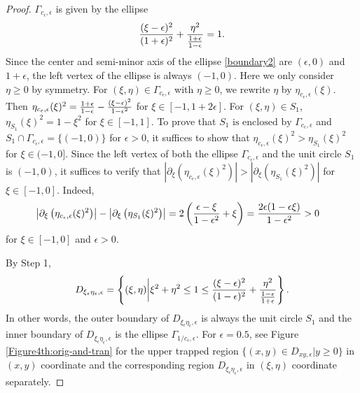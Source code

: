 \documentclass[1 [leqno, 11pt]{amsart}
\numberwithin{equation}{section}
\let\ep=\epsilon
\begin{document}
\begin{CJK*}{GBK}{song}
\begin{proof}
$\Gamma_{c_\ep,\ep}$ is given by the ellipse
\begin{align}\label{boundary2}
\frac{(\xi - \ep)^2}{(1+\ep)^2} + {\eta^2\over {1+\ep\over 1-\ep}}=1.
\end{align}
Since the center and semi-minor axis of the ellipse \eqref{boundary2} are $(\ep,0)$ and $1+\ep$, the left vertex of the ellipse is always $(-1,0)$.
Here we only consider $\eta\geq0$ by  symmetry.
For $(\xi,\eta)\in \Gamma_{c_\ep,\ep}$ with $\eta\geq0$, we rewrite $\eta$ by $\eta_{c_\ep,\ep}(\xi)$. Then $\eta_{c_\ep,\ep}(\xi)^2={1+\ep\over 1-\ep}-\frac{(\xi - \ep)^2}{1-\ep^2}$ for $\xi\in[-1,1+2\ep]$. For  $(\xi,\eta)\in S_1$, $\eta_{S_1}(\xi)^2=1-\xi^2$ for $\xi\in[-1,1]$.
To prove that $S_1\text{  is  enclosed by } \Gamma_{c_\ep,\ep}$ and ${S}_1\cap\Gamma_{c_\ep,\ep}=\{(-1,0)\}$ for $\ep>0$, it suffices to show that $\eta_{c_\ep,\ep}(\xi)^2>\eta_{S_1}(\xi)^2$ for $\xi\in(-1,0]$.
Since the left vertex of both the ellipse $\Gamma_{c_\ep,\ep}$ and the unit circle $S_1$ is  $(-1,0)$, it suffices to verify that $\left|\partial_{\xi}\left(\eta_{c_\ep,\ep}(\xi)^2\right)\right|>\left|\partial_{\xi}\left(\eta_{S_1}(\xi)^2\right)\right|$ for $\xi\in[-1,0]$. Indeed,
\begin{align*}
&\left|\partial_{\xi}\left(\eta_{c_\ep,\ep}(\xi)^2\right)\right|-\left|\partial_{\xi}\left(\eta_{S_1}(\xi)^2\right)\right|=2\left(\frac{ \ep-\xi}{1-\ep^2}+\xi\right)
={2\ep(1-\ep\xi)\over 1-\ep^2}>0
\end{align*}
 for $\xi\in[-1,0]$ and $\ep>0$.

By Step 1,
\begin{align*}
D_{\xi_\ep\eta_\ep,\ep}=\left\{(\xi,\eta)\bigg|\xi^2+\eta^2\leq 1\leq\frac{(\xi - \ep)^2}{(1-\ep)^2} + {\eta^2\over {1-\ep\over 1+\ep}} \right\}.
\end{align*}
In other words, the outer boundary of $D_{\xi_\ep\eta_\ep,\ep}$ is always the unit circle $S_1$ and the inner boundary of $D_{\xi_\ep\eta_\ep,\ep}$ is the ellipse $\Gamma_{1/c_\ep,\ep}$. For $\ep=0.5$, see Figure \ref{Figure4th:orig-and-tran} for the upper trapped region $\{(x,y)\in D_{xy,\ep}|y\geq0\}$ in $(x,y)$ coordinate and  the corresponding region $D_{\xi_\ep\eta_\ep,\ep}$ in $(\xi,\eta)$ coordinate separately.


\end{proof}
\end{CJK*}
\end{document}
